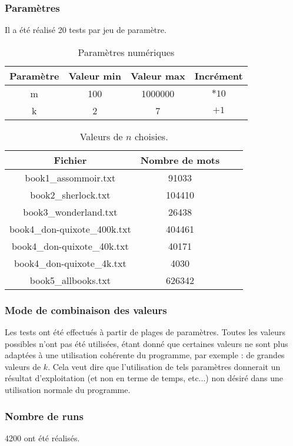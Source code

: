 \subsubsection{Paramètres}
Il a été réalisé 20 tests par jeu de paramètre.

\begin{table}[H]
	\centering
	\caption{Paramètres numériques}
	\label{tab:parametresNumeriquesFournie}
	\begin{tabular}{c|ccc}
		\toprule
		Paramètre & Valeur min & Valeur max & Incrément\\
		\midrule
		m & 100 & 1000000 & $*10$\\
		k & 2 & 7 & $+1$\\
		\bottomrule
	\end{tabular}
\end{table}

\begin{table}[H]
	\centering
	\caption{Valeurs de $n$ choisies.}
	\label{tab:valeursDeNChoisiesFournie}
	\begin{tabular}{c|ccc}
		\toprule
		Fichier & Nombre de mots\\
		\midrule
		book1\_assommoir.txt & 91033\\
		book2\_sherlock.txt & 104410\\
		book3\_wonderland.txt & 26438\\
		book4\_don-quixote\_400k.txt & 404461\\
		book4\_don-quixote\_40k.txt & 40171\\
		book4\_don-quixote\_4k.txt & 4030\\
		book5\_allbooks.txt & 626342\\
		\bottomrule
	\end{tabular}
\end{table}


\subsubsection{Mode de combinaison des valeurs}
Les tests ont été effectués à partir de plages de paramètres. Toutes les valeurs possibles n'ont pas été utilisées, étant donné que certaines valeurs ne sont plus adaptées à une utilisation cohérente du programme, par exemple : de grandes valeurs de $k$. Cela veut dire que l'utilisation de tels paramètres donnerait un résultat d'exploitation (et non en terme de temps, etc...) non désiré dans une utilisation normale du programme.

\subsubsection{Nombre de runs}
4200 ont été réalisés.

